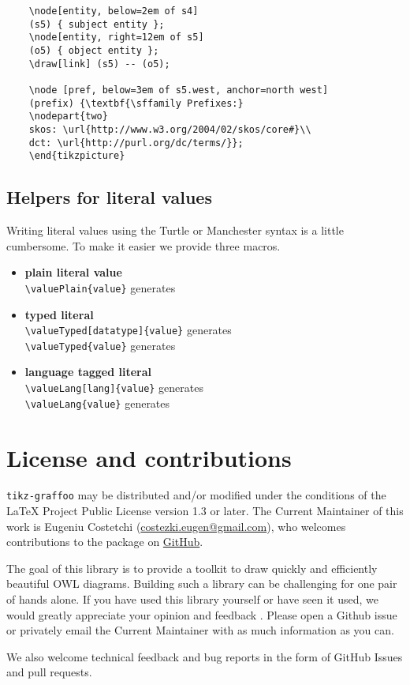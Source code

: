 \documentclass[11pt,a4paper,final,oneside,onecolumn]{article}
\begin{document}
\begin{verbatim}
	\node[entity, below=2em of s4]
	(s5) { subject entity };
	\node[entity, right=12em of s5]
	(o5) { object entity };
	\draw[link] (s5) -- (o5);
	
	\node [pref, below=3em of s5.west, anchor=north west]
	(prefix) {\textbf{\sffamily Prefixes:}
	\nodepart{two} 
	skos: \url{http://www.w3.org/2004/02/skos/core#}\\ 
	dct: \url{http://purl.org/dc/terms/}};
	\end{tikzpicture}	
	\end{verbatim}
	
	\subsection{Helpers for literal values}
	
	Writing literal values using the Turtle or Manchester syntax is a little cumbersome. To make it easier we provide three macros. 
	
	\begin{itemize}
		\item \textbf{plain literal value}\\
		\verb|| generates \valuePlain{value}
		\item \textbf{typed literal}\\
		\verb|| generates \valueTyped[datatype]{value}\\
		\verb|| generates \valueTyped{value}
		\item \textbf{language tagged literal}\\
		\verb|| generates \valueLang[lang]{value}\\
		\verb|| generates \valueLang{value}
	\end{itemize}
	
	\section{License and contributions}
	\texttt{tikz-graffoo} may be distributed and/or modified under the conditions of the LaTeX Project
Public License version 1.3 or later. The Current Maintainer of this work is Eugeniu Costetchi (\url{costezki.eugen@gmail.com}), who welcomes contributions to the
package on \href{https://github.com/costezki/owl4latex}{GitHub}.
	
	The goal of this library is to provide a toolkit to draw quickly and efficiently beautiful OWL diagrams. Building such a library can be challenging for one pair of hands alone. If you have used this library yourself or have seen it used, we would greatly appreciate your opinion and feedback . Please open a Github issue or privately email the Current Maintainer with as much information as you can. 
	
	We also welcome technical feedback and bug reports in the form of GitHub Issues
	and pull requests.
\end{document}
